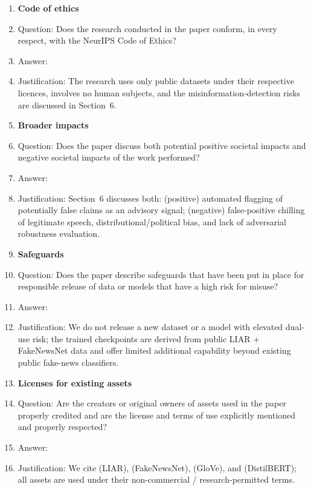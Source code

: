 \documentclass{article}
\begin{document}
\begin{enumerate}
\item {\bf Code of ethics}
    \item[] Question: Does the research conducted in the paper conform, in every respect, with the NeurIPS Code of Ethics?
    \item[] Answer: \answerYes{}
    \item[] Justification: The research uses only public datasets under their respective licences, involves no human subjects, and the misinformation-detection risks are discussed in Section~6.

\item {\bf Broader impacts}
    \item[] Question: Does the paper discuss both potential positive societal impacts and negative societal impacts of the work performed?
    \item[] Answer: \answerYes{}
    \item[] Justification: Section~6 discusses both: (positive) automated flagging of potentially false claims as an advisory signal; (negative) false-positive chilling of legitimate speech, distributional/political bias, and lack of adversarial robustness evaluation.

\item {\bf Safeguards}
    \item[] Question: Does the paper describe safeguards that have been put in place for responsible release of data or models that have a high risk for misuse?
    \item[] Answer: \answerNA{}
    \item[] Justification: We do not release a new dataset or a model with elevated dual-use risk; the trained checkpoints are derived from public LIAR + FakeNewsNet data and offer limited additional capability beyond existing public fake-news classifiers.

\item {\bf Licenses for existing assets}
    \item[] Question: Are the creators or original owners of assets used in the paper properly credited and are the license and terms of use explicitly mentioned and properly respected?
    \item[] Answer: \answerYes{}
    \item[] Justification: We cite \citet{wang2017liar} (LIAR), \citet{shu2020fakenewsnet} (FakeNewsNet), \citet{pennington2014glove} (GloVe), and \citet{sanh2019distilbert} (DistilBERT); all assets are used under their non-commercial / research-permitted terms.


\end{enumerate}
\end{document}
